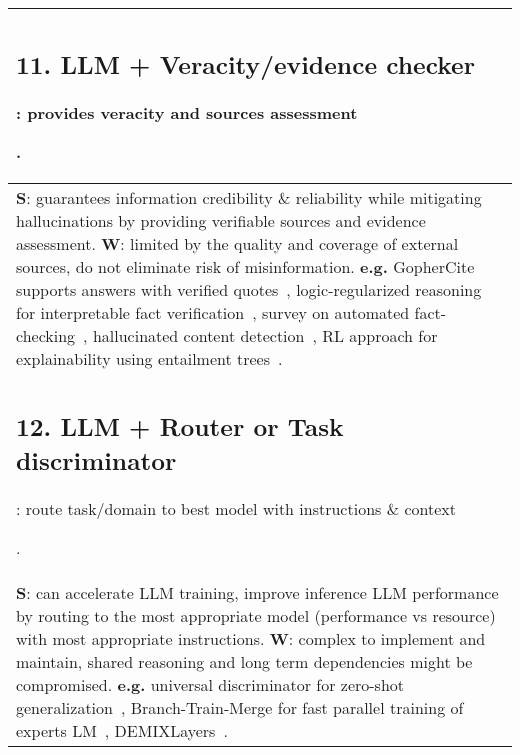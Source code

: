 \documentclass[acmsmall]{acmart}
\begin{document}
{\begin{longtable}{p{1\linewidth}}
{\subsection{11. LLM + Veracity/evidence checker}\label{HP11}:
provides veracity and sources assessment}. \\\midrule
{\textbf{S}: guarantees information credibility \& reliability while mitigating hallucinations by providing verifiable sources and evidence assessment.
\newline \textbf{W}:} limited by the quality and coverage of external sources, do not eliminate risk of misinformation. \newline \textbf{e.g.} GopherCite supports answers with verified quotes~\citep{menickTeachingLanguageModels2022}, logic-regularized reasoning for interpretable fact verification~\citep{chenLORENLogicRegularizedReasoning2022}, survey on automated fact-checking~\citep{guoSurveyAutomatedFactChecking2022}, hallucinated content detection~\citep{zhouDetectingHallucinatedContent2021}, RL approach for explainability using entailment trees~\citep{liuRLETReinforcementLearning2022}. \\\midrule

{\subsection{12. LLM + Router or Task discriminator}\label{HP12}:
route task/domain to best model with instructions \& context}. \\\midrule
{\textbf{S}: can accelerate LLM training, improve inference LLM performance by routing to the most appropriate model (performance vs resource) with most appropriate instructions. \newline \textbf{W}:} complex to implement and maintain, shared reasoning and long term dependencies might be compromised. \newline \textbf{e.g.} universal discriminator for zero-shot generalization~\citep{xuUniversalDiscriminatorZeroShot2022}, Branch-Train-Merge for fast parallel training of experts LM~\citep{liBranchTrainMergeEmbarrassinglyParallel2022}, DEMIXLayers~\citep{gururanganDEMixLayersDisentangling2021}. \\\midrule


\end{longtable}}
\end{document}
